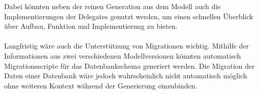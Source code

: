 \documentclass[./einleitung.tex]{subfiles}
\begin{document}
    Dabei könnten neben der reinen Generation aus dem Modell auch die Implementierungen der Delegates genutzt werden, um einen schnellen Überblick über Aufbau, Funktion und Implementierung zu bieten.
    \\\\
    Langfristig wäre auch die Unterstützung von Migrationen wichtig.
    Mithilfe der Informationen aus zwei verschiedenen Modellversionen könnten automatisch Migrationsscripte für das Datenbankschema generiert werden.
    Die Migration der Daten einer Datenbank wäre jedoch wahrscheinlich nicht automatisch möglich ohne weiteren Kontext während der Generierung einzubinden.
\end{document}
